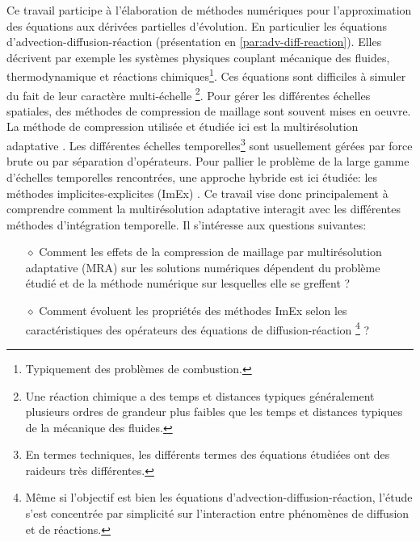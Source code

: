 Ce travail participe à l'élaboration de méthodes numériques pour l'approximation des équations aux dérivées partielles d'évolution.
En particulier les équations d'advection-diffusion-réaction (présentation en \ref{par:adv-diff-reaction}). Elles décrivent par exemple les systèmes physiques couplant
mécanique des fluides, thermodynamique et réactions chimiques\footnote{Typiquement des problèmes de combustion.}.
Ces équations sont difficiles à simuler du fait de leur caractère multi-échelle
\footnote{Une réaction chimique a des temps et distances typiques généralement plusieurs ordres de grandeur plus faibles que les temps et distances typiques de la mécanique des fluides.}.
Pour gérer les différentes échelles spatiales, des méthodes de compression de maillage sont souvent mises en oeuvre. 
La méthode de compression utilisée et étudiée ici est la multirésolution adaptative \cite{harten1994}.
Les différentes échelles temporelles\footnote{En termes techniques, les différents termes des équations étudiées ont des raideurs très différentes.}
sont usuellement gérées par force brute ou par séparation d'opérateurs. 
Pour pallier le problème de la large gamme d'échelles temporelles rencontrées, une approche hybride est ici étudiée: les méthodes implicites-explicites (ImEx) \cite{ASCHER1997151}.
Ce travail vise donc principalement à comprendre comment la multirésolution adaptative interagit avec les différentes méthodes d'intégration temporelle.
Il s'intéresse aux questions suivantes:
\begin{itemize}
\item[$\diamond$] {Comment les effets de la compression de maillage par multirésolution adaptative (MRA) sur les solutions numériques
dépendent du problème étudié et de la méthode numérique sur lesquelles elle se greffent ?}
\item[$\diamond$] {Comment évoluent les propriétés des méthodes ImEx selon les caractéristiques des opérateurs des équations de diffusion-réaction}
                \footnote{Même si l'objectif est bien les équations d'advection-diffusion-réaction, l'étude s'est concentrée par simplicité sur l'interaction entre phénomènes de diffusion et de réactions.}
                { ?}
\end{itemize}